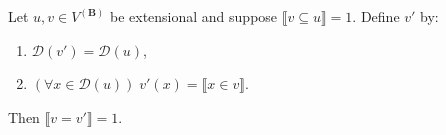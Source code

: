 Let $u, v \in V^{(\mathbf{B})}$ be extensional and suppose $\llbracket v \subseteq u \rrbracket = 1$. Define $v'$ by:
\begin{enumerate}
\item $\mathcal{D}(v') = \mathcal{D}(u)$,
\item $(\forall x \in \mathcal{D}(u))\; v'(x) = \llbracket x \in v \rrbracket$.
\end{enumerate}
Then $\llbracket v = v' \rrbracket = 1$.
